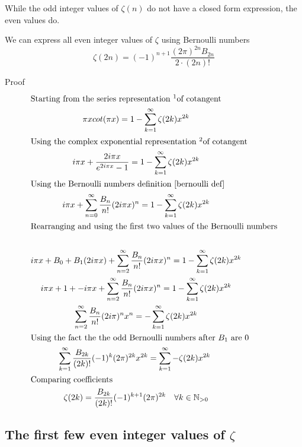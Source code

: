 \documentclass[a4paper]{article}
\begin{document}
While the odd integer values of $\zeta(n)$ do not have a closed form expression, the even values do.

\begin{theorem}
We can express all even integer values of $\zeta$ using Bernoulli numbers
\begin{equation} \label{even zeta} 
\zeta(2n) = (-1)^{n+1} \frac{(2\pi)^{2n} B_{2n}}{2 \cdot (2n)!}
\end{equation}

Proof
\begin{gather*}
\intertext{Starting from the series representation \footnotemark of cotangent}
\pi x cot(\pi x) = 1 - \sum_{k=1}^{\infty} \zeta(2k) x^{2k}
\\
\intertext{Using the complex exponential representation \footnotemark of cotangent}
i \pi x +  \frac{2i \pi x}{e^{2 i\pi x} -1} = 1 - \sum_{k=1}^{\infty} \zeta(2k) x^{2k}
\\
\intertext{Using the Bernoulli numbers definition \ref{bernoulli def}} 
i \pi x + \sum_{n=0}^{\infty} \frac{B_n}{n!} (2 i\pi x)^n
 = 1 - \sum_{k=1}^{\infty} \zeta(2k) x^{2k}
\\
\intertext{Rearranging and using the first two values of the Bernoulli numbers} 
\\
i \pi x + B_0 + B_1 (2 i \pi x) +  \sum_{n=2}^{\infty} \frac{B_n}{n!} (2 i\pi x)^n
 = 1 - \sum_{k=1}^{\infty} \zeta(2k) x^{2k}
\\
i \pi x + 1 + - i \pi x +  \sum_{n=2}^{\infty} \frac{B_n}{n!} (2 i\pi x)^n
 = 1 - \sum_{k=1}^{\infty} \zeta(2k) x^{2k}
\\
\sum_{n=2}^{\infty} \frac{B_n}{n!} (2 i\pi)^nx^n
 = - \sum_{k=1}^{\infty} \zeta(2k) x^{2k}
\\
\intertext{Using the fact the the odd Bernoulli numbers after $B_1$ are 0} 
\sum_{k=1}^{\infty} \frac{B_{2k}}{(2k)!} (-1)^{k}(2 \pi)^{2k} x^{2k}
 = \sum_{k=1}^{\infty} - \zeta(2k) x^{2k}\ 
\\
\intertext{Comparing coefficients}
\zeta(2k) =  \frac{B_{2k}}{(2k)!} (-1)^{k+1}(2 \pi)^{2k} \quad \forall  k \in \mathbb N_{> 0}
\end{gather*}
\end{theorem}

\addtocounter{footnote}{-1}

\subsection{The first few even integer values of $\zeta$}
\end{document}
